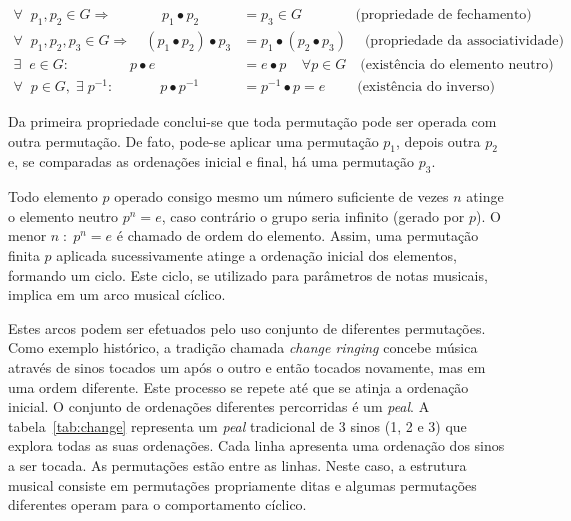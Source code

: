 \begin{equation}\label{eq:groups}
\begin{split}
\forall \;\; p_1,p_2 \in G \Rightarrow\quad\quad\quad\;\; p_1 \bullet p_2 & = p_3 \in G  \quad\quad\quad\;\;\;\text{(propriedade de fechamento)} \\
\forall \;\; p_1,p_2,p_3 \in G \Rightarrow\quad (p_1\bullet p_2)\bullet p_3 & = p_1\bullet (p_2\bullet p_3)\quad\;  \text{(propriedade da associatividade)} \\
\exists \;\; e \in G :\quad\quad\quad\quad\; p \bullet e & = e \bullet p \;\;\;\; \forall p \in G  \quad \text{(existência do elemento neutro)} \\
\forall \;\; p \in G, \;\exists\; p^{-1} :\quad\quad\quad\;  p\bullet p^{-1} & =p^{-1}\bullet p = e  \quad\quad\;\text{(existência do inverso)}
\end{split}
\end{equation}


Da primeira propriedade conclui-se que toda permutação pode ser operada com outra permutação. De fato, pode-se aplicar uma permutação $p_1$, depois outra $p_2$ e, se comparadas as ordenações inicial e final, há uma permutação $p_3$.

Todo elemento $p$ operado consigo mesmo um número suficiente de vezes $n$ atinge o elemento neutro $p^n=e$, caso contrário o grupo seria infinito (gerado por $p$). O menor $n\;:\;p^n=e$ é chamado de ordem do elemento. Assim, uma permutação finita $p$ aplicada sucessivamente atinge a ordenação inicial dos elementos, formando um ciclo. Este ciclo, se utilizado para parâmetros de notas musicais, implica em um arco musical cíclico.

Estes arcos podem ser efetuados pelo uso conjunto de diferentes permutações. Como exemplo
histórico, a tradição chamada \emph{change ringing} concebe música através de sinos tocados um após o outro e então tocados novamente, mas em uma ordem diferente. Este processo se repete até que se atinja a ordenação inicial. O conjunto de ordenações diferentes percorridas é um \emph{peal}. A tabela~\ref{tab:change} representa um \emph{peal} tradicional de 3 sinos (1, 2 e 3) que explora todas as suas ordenações. Cada linha apresenta uma ordenação dos sinos a ser tocada. As permutações estão entre as linhas.
Neste caso, a estrutura musical consiste em permutações propriamente ditas e algumas permutações diferentes operam para o comportamento cíclico. 

